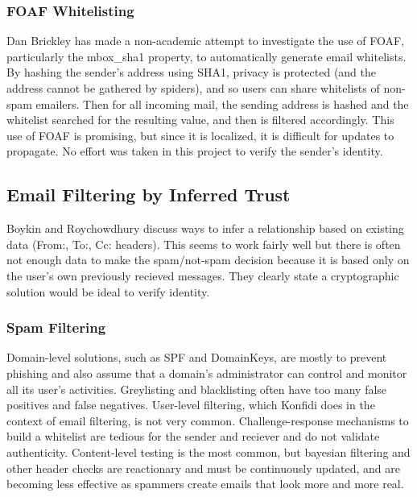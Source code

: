 \documentclass{acm_proc_article-sp}
\begin{document}
\subsubsection{FOAF Whitelisting}
Dan Brickley has made a non-academic attempt to investigate the use of FOAF, particularly the mbox\_sha1 property, to automatically generate email whitelists. By hashing the sender's address using SHA1, privacy is protected (and the address cannot be gathered by spiders), and so users can share whitelists of non-spam emailers. Then for all incoming mail, the sending address is hashed and the whitelist searched for the resulting value, and then is filtered accordingly. This use of FOAF is promising, but since it is localized, it is difficult for updates to propagate\cite{foafWhitelisting}. No effort was taken in this project to verify the sender's identity.

\subsection{Email Filtering by Inferred Trust}
Boykin and Roychowdhury discuss ways to infer a relationship based on existing data (From:, To:, Cc: headers)\cite{boykin04email}. This seems to work fairly well but there is often not enough data to make the spam/not-spam decision because it is based only on the user's own previously recieved messages. They clearly state a cryptographic solution would be ideal to verify identity.

\subsubsection{Spam Filtering}
Domain-level solutions, such as SPF and DomainKeys, are mostly to prevent phishing and also assume that a domain's administrator can control and monitor all its user's activities. Greylisting and blacklisting often have too many false positives and false negatives. User-level filtering, which Konfidi does in the context of email filtering, is not very common. Challenge-response mechanisms to build a whitelist are tedious for the sender and reciever and do not validate authenticity. Content-level testing is the most common, but bayesian filtering and other header checks are reactionary and must be continuously updated, and are becoming less effective as spammers create emails that look more and more real. 
\end{document}
